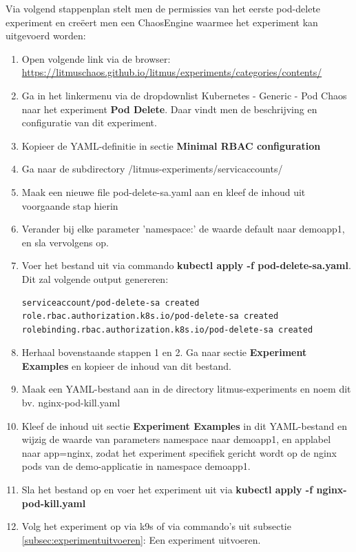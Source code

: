 Via volgend stappenplan stelt men de permissies van het eerste pod-delete experiment en creëert men een ChaosEngine waarmee het experiment kan uitgevoerd worden: 
\begin{enumerate}
    \item Open volgende link via de browser: \url{https://litmuschaos.github.io/litmus/experiments/categories/contents/} 
    \item Ga in het linkermenu via de dropdownlist Kubernetes - Generic - Pod Chaos naar het experiment {\bf Pod Delete}. Daar vindt men de beschrijving en configuratie van dit experiment.
    \item Kopieer de YAML-definitie in sectie {\bf Minimal RBAC configuration}
    \item Ga naar de subdirectory /litmus-experiments/servicaccounts/
    \item Maak een nieuwe file pod-delete-sa.yaml aan en kleef de inhoud uit voorgaande stap hierin
    \item Verander bij elke parameter 'namespace:' de waarde default naar demoapp1, en sla vervolgens op.
    \item Voer het bestand uit via commando {\bf kubectl apply -f pod-delete-sa.yaml}. Dit zal volgende output genereren:
\begin{lstlisting}[language=bash]    
serviceaccount/pod-delete-sa created
role.rbac.authorization.k8s.io/pod-delete-sa created
rolebinding.rbac.authorization.k8s.io/pod-delete-sa created
\end{lstlisting}
    \item Herhaal bovenstaande stappen 1 en 2. Ga naar sectie {\bf Experiment Examples} en kopieer de inhoud van dit bestand.
    \item Maak een YAML-bestand aan in de directory litmus-experiments en noem dit bv. nginx-pod-kill.yaml
    \item Kleef de inhoud uit sectie {\bf Experiment Examples} in dit YAML-bestand en wijzig  de waarde van parameters namespace naar demoapp1, en applabel naar app=nginx, zodat het experiment specifiek gericht wordt op de nginx pods van de demo-applicatie in namespace demoapp1.
    \item Sla het bestand op en voer het experiment uit via {\bf kubectl apply -f nginx-pod-kill.yaml}
    \item Volg het experiment op via k9s of via commando's uit subsectie \ref{subsec:experimentuitvoeren}: Een experiment uitvoeren.
\end{enumerate}


